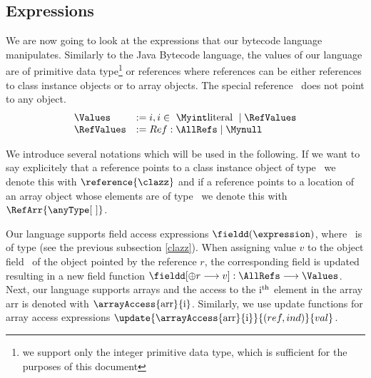
\newtheorem{Expression}{Definition}[section]



\subsection{Expressions}\label{lang}

We are now going to look at the expressions that our bytecode language manipulates. 
Similarly to the Java Bytecode language, the values of our language are of primitive data 
type\footnote{ we support only the integer primitive data type, which is sufficient for the purposes of this document} or references
where  references can be either references to class instance objects or to array objects. 
The special reference \Mynull \ does not point to any object.  
$$ \begin{array}{ll}
             \Values & := i, i \in \  \Myint \mbox{\rm literal } \mid \RefValues \\
	     \RefValues & := Ref : \AllRefs \mid \Mynull 
  \end{array} $$


 We introduce several notations which will be used in the following.
 If we want to say explicitely that a reference points to a class instance object of type \clazz \ we denote this with $\reference{\clazz}$ and if
 a reference points to a location of an array object whose elements are of type \anyType \ we denote this
 with $\RefArr{\anyType \lbrack \ \rbrack}$.
 


 Our language supports field access expressions $\fieldd(\expression)$, where \fieldd \ is of type \FieldSet (see the previous subsection \ref{clazz}).
 When assigning value $v$ to the object field \fieldd \ of the object pointed by the reference $r$,
 the  corresponding field is updated resulting in a new field function $\fieldd[ \oplus r \longrightarrow v]: \AllRefs \longrightarrow \Values $.
 Next, our language supports arrays
 and the access to the $\rm{i^{th}}$ element in the array \textrm{arr} is denoted with $ \arrayAccess{\rm{arr}}{\rm{i}}$.
 Similarly, we use update functions for array access expressions  $ \update{\arrayAccess{\rm{arr}}{\rm{i}}}{ (ref, ind)  } { val}$.

